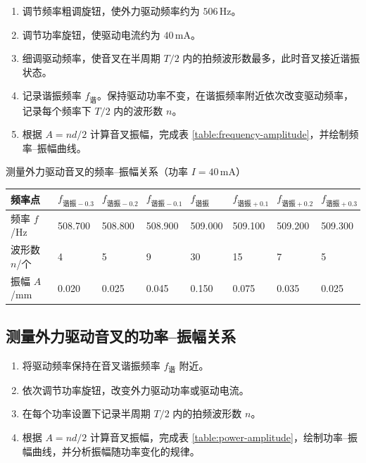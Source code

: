 \documentclass{../template/myrpt}
\begin{document}
\begin{enumerate}[label=\arabic*)]
  \item 调节频率粗调旋钮，使外力驱动频率约为 $506\,\si{\hertz}$。
  \item 调节功率旋钮，使驱动电流约为 $40\,\si{\milli\ampere}$。
  \item 细调驱动频率，使音叉在半周期 $T/2$ 内的拍频波形数最多，此时音叉接近谐振状态。
  \item 记录谐振频率 $f_{\text{谐}}$。保持驱动功率不变，在谐振频率附近依次改变驱动频率，记录每个频率下 $T/2$ 内的波形数 $n$。
  \item 根据 $A=nd/2$ 计算音叉振幅，完成表 \ref{table:frequency-amplitude}，并绘制频率--振幅曲线。
\end{enumerate}

\begin{LabRecordTable}
  \centering
  \caption{测量外力驱动音叉的频率--振幅关系（功率 $I=40\,\si{\milli\ampere}$）}
  \label{table:frequency-amplitude}
  \renewcommand{\arraystretch}{1.35}
  \setlength{\tabcolsep}{3pt}
  \small
  \begin{tabularx}{\textwidth}{C{2.2cm} *{7}{Y}}
    \toprule
    频率点 & $f_{\text{谐振}-0.3}$ & $f_{\text{谐振}-0.2}$ & $f_{\text{谐振}-0.1}$ & $f_{\text{谐振}}$ & $f_{\text{谐振}+0.1}$ & $f_{\text{谐振}+0.2}$ & $f_{\text{谐振}+0.3}$ \\
    \midrule
    频率 $f$/\si{\hertz} & 508.700 & 508.800 & 508.900 & 509.000 & 509.100 & 509.200 & 509.300 \\
    波形数 $n$/个 & 4 & 5 & 9 & 30 & 15 & 7 & 5 \\
    振幅 $A$/\si{\milli\metre} & 0.020 & 0.025 & 0.045 & 0.150 & 0.075 & 0.035 & 0.025 \\
    \bottomrule
  \end{tabularx}
\end{LabRecordTable}

\subsection{测量外力驱动音叉的功率--振幅关系}

\begin{enumerate}[label=\arabic*)]
  \item 将驱动频率保持在音叉谐振频率 $f_{\text{谐}}$ 附近。
  \item 依次调节功率旋钮，改变外力驱动功率或驱动电流。
  \item 在每个功率设置下记录半周期 $T/2$ 内的拍频波形数 $n$。
  \item 根据 $A=nd/2$ 计算音叉振幅，完成表 \ref{table:power-amplitude}，绘制功率--振幅曲线，并分析振幅随功率变化的规律。
\end{enumerate}
\end{document}
